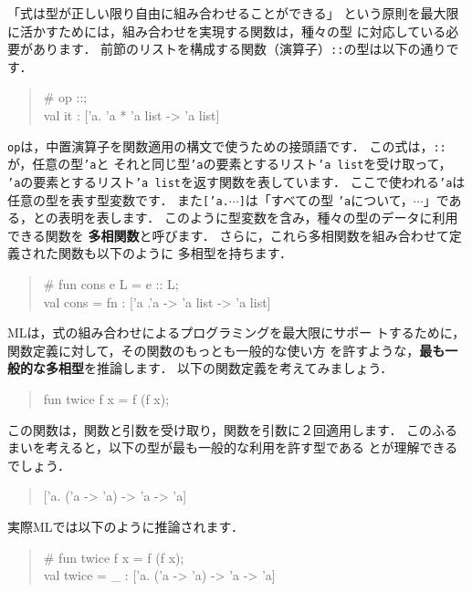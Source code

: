 \documentclass{jbook}
\newif\ifjp
\begin{document}
\ifjp%
	「式は型が正しい限り自由に組み合わせることができる」
という原則を最大限に活かすためには，組み合わせを実現する関数は，種々の型
に対応している必要があります．
	前節のリストを構成する関数（演算子）{\tt ::}の型は以下の通りです．
\begin{tt}
\begin{quote}
\# op ::;\\
val it : ['a. 'a * 'a list -> 'a list]
\end{quote}
\end{tt}
{\tt op}は，中置演算子を関数適用の構文で使うための接頭語です．
	この式は，{\tt ::}が，任意の型{\tt 'a}と
それと同じ型{\tt 'a}の要素とするリスト{\tt 'a list}を受け取って，
{\tt 'a}の要素とするリスト{\tt 'a list}を返す関数を表しています．
	ここで使われる{\tt 'a}は任意の型を表す型変数です．
	また{\tt ['a.$\cdots$]}は「すべての型
{\tt 'a}について，$\cdots$」である，との表明を表します．
	このように型変数を含み，種々の型のデータに利用できる関数を
{\bf 多相関数}と呼びます．
	さらに，これら多相関数を組み合わせて定義された関数も以下のように
多相型を持ちます．
\begin{tt}
\begin{quote}
\# fun cons  e L  = e :: L;
\\
val cons = fn : ['a .'a  ->  'a list  -> 'a list]
\end{quote}
\end{tt}
	MLは，式の組み合わせによるプログラミングを最大限にサポー
トするために，関数定義に対して，その関数のもっとも一般的な使い方
を許すような，{\bf 最も一般的な多相型}を推論します．
	以下の関数定義を考えてみましょう．
\begin{tt}
\begin{quote}
fun twice f x = f (f x);
\end{quote}
\end{tt}
	この関数は，関数と引数を受け取り，関数を引数に２回適用します．
	このふるまいを考えると，以下の型が最も一般的な利用を許す型である
とが理解できるでしょう．
\begin{tt}
\begin{quote}
 ['a. ('a -> 'a) -> 'a -> 'a]
\end{quote}
\end{tt}
	実際MLでは以下のように推論されます．
\begin{tt}
\begin{quote}
\# fun twice f x = f (f x);
\\
val twice = \_ : ['a. ('a -> 'a) -> 'a -> 'a]
\end{quote}
\end{tt}
\end{document}

